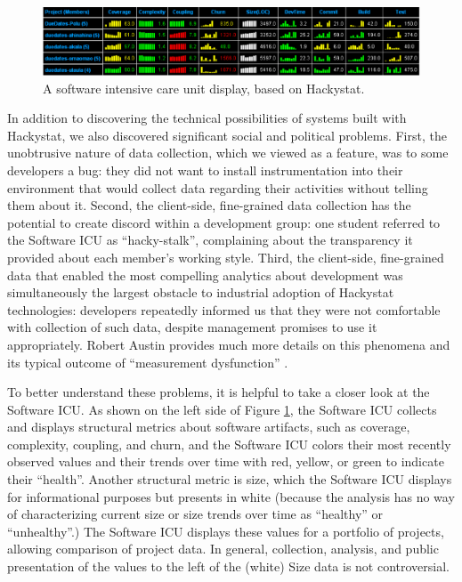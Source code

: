 \documentclass[]{article}
\begin{document}
\begin{figure}[!tb]
\centering
\includegraphics[width=1.0\columnwidth]{portfolio-2008.eps}
\caption{A software intensive care unit display, based on Hackystat.}
\label{fig:icu}
\end{figure}


In addition to discovering the technical possibilities of systems built with Hackystat, we
also discovered significant social and political problems.  First, the unobtrusive nature of
data collection, which we viewed as a feature, was to some developers a bug: they did not
want to install instrumentation into their environment that would collect data regarding
their activities without telling them about it.  Second, the client-side, fine-grained
data collection has the potential to create discord within a development group: one
student referred to the Software ICU as ``hacky-stalk'', complaining about the
transparency it provided about each member's working style.  Third,
the client-side, fine-grained data that enabled the most compelling analytics about
development was simultaneously the largest obstacle to industrial adoption of Hackystat
technologies: developers repeatedly informed us that they were not comfortable with
collection of such data, despite management promises to use it appropriately. Robert
Austin provides much more details on this phenomena and its typical outcome of
``measurement dysfunction'' \cite{Austin96}.

To better understand these problems, it is helpful to take a closer look at the Software
ICU.  As shown on the left side of Figure \ref{fig:icu}, the Software ICU collects and
displays structural metrics about software artifacts, such as coverage, complexity,
coupling, and churn, and the Software ICU colors their most recently observed values and
their trends over time with red, yellow, or green to indicate their ``health''.  Another
structural metric is size, which the Software ICU displays for informational purposes but
presents in white (because the analysis has no way of characterizing current size or size
trends over time as ``healthy'' or ``unhealthy''.)  The Software ICU displays these values
for a portfolio of projects, allowing comparison of project data.  In general, collection,
analysis, and public presentation of the values to the left of the (white) Size data is
not controversial.
\end{document}
